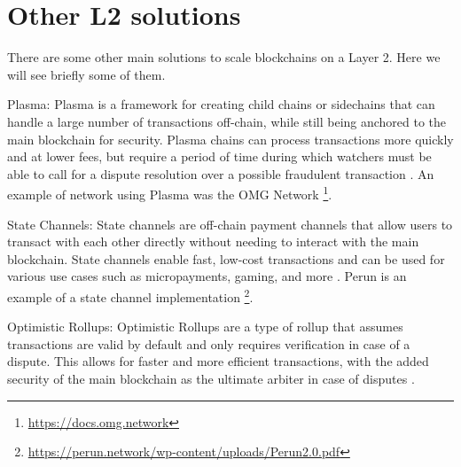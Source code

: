 \section{Other L2 solutions}
There are some other main solutions to scale blockchains on a Layer 2. Here we will see briefly some of them.

Plasma: Plasma is a framework for creating child chains or sidechains that can handle a large number of transactions off-chain, while still being anchored to the main blockchain for security. Plasma chains can process transactions more quickly and at lower fees, but require a period of time during which watchers must be able to call for a dispute resolution over a possible fraudulent transaction \cite{thibault_blockchain_2022}. An example of network using Plasma was the OMG Network \footnote{\url{https://docs.omg.network}}.

State Channels: State channels are off-chain payment channels that allow users to transact with each other directly without needing to interact with the main blockchain. State channels enable fast, low-cost transactions and can be used for various use cases such as micropayments, gaming, and more \cite{negka_blockchain_2021}. Perun is an example of a state channel implementation \footnote{\url{https://perun.network/wp-content/uploads/Perun2.0.pdf}}.


Optimistic Rollups: Optimistic Rollups are a type of rollup that assumes transactions are valid by default and only requires verification in case of a dispute. This allows for faster and more efficient transactions, with the added security of the main blockchain as the ultimate arbiter in case of disputes \cite{thibault_blockchain_2022}.
